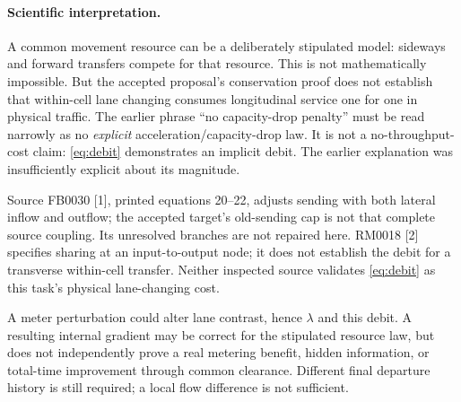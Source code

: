 \documentclass[10pt,a4paper]{article}
\begin{document}
\paragraph{Scientific interpretation.}
A common movement resource can be a deliberately stipulated model: sideways
and forward transfers compete for that resource. This is not mathematically
impossible. But the accepted proposal's conservation proof does not establish
that within-cell lane changing consumes longitudinal service one for one in
physical traffic. The earlier phrase ``no capacity-drop penalty'' must be read
narrowly as no \emph{explicit} acceleration/capacity-drop law. It is not a
no-throughput-cost claim: \eqref{eq:debit} demonstrates an implicit debit.
The earlier explanation was insufficiently explicit about its magnitude.

Source FB0030 [1], printed equations 20--22, adjusts sending with both lateral
inflow and outflow; the accepted target's old-sending cap is not that complete
source coupling. Its unresolved branches are not repaired here. RM0018 [2]
specifies sharing at an input-to-output node; it does not establish the debit
for a transverse within-cell transfer. Neither inspected source validates
\eqref{eq:debit} as this task's physical lane-changing cost.

A meter perturbation could alter lane contrast, hence $\lambda$ and this debit.
A resulting internal gradient may be correct for the stipulated resource law,
but does not independently prove a real metering benefit, hidden information,
or total-time improvement through common clearance. Different final departure
history is still required; a local flow difference is not sufficient.
\newpage
\end{document}
